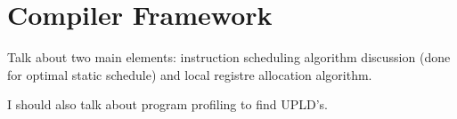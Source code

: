 \section{Compiler Framework}
\label{sec:compiler}

Talk about two main elements: instruction scheduling algorithm discussion (done for optimal
static schedule) and local registre allocation algorithm.

I should also talk about program profiling to find UPLD's.
